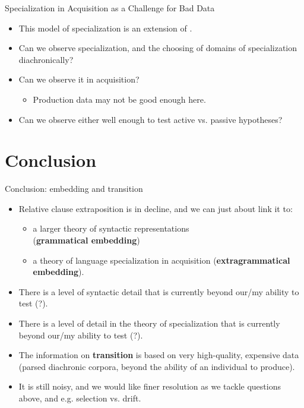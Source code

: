 \documentclass[hyperref={pdfpagelabels=false}]{beamer}
\begin{document}
\begin{frame}{Specialization in Acquisition as a Challenge for Bad Data}
		\begin{itemize}
			\item This model of specialization is an extension of \citet{yang2000, yang2002}.
			\item Can we observe specialization, and the choosing of domains of specialization diachronically?
			\item Can we observe it in acquisition?
				\begin{itemize}
					\item Production data may not be good enough here.
				\end{itemize}
			\item Can we observe either well enough to test active vs. passive hypotheses?
		\end{itemize}
\end{frame}

\section{Conclusion}

\begin{frame}{Conclusion: embedding and transition}
		\begin{itemize}
			\item Relative clause extraposition is in decline, and we can just about link it to:
			\begin{itemize}
			\item a larger theory of syntactic representations \\(\textbf{grammatical embedding})
			\item a theory of language specialization in acquisition (\textbf{extragrammatical embedding}).
			\end{itemize}
			\item There is a level of syntactic detail that is currently beyond our/my ability to test (?).
			\item There is a level of detail in the theory of specialization that is currently beyond our/my ability to test (?).
			\item The information on \textbf{transition} is based on very high-quality, expensive data (parsed diachronic corpora, beyond the ability of an individual to produce).%
			\item It is still noisy, and we would like finer resolution as we tackle questions above, and e.g. selection vs. drift.
		\end{itemize}
\end{frame}
\end{document}
